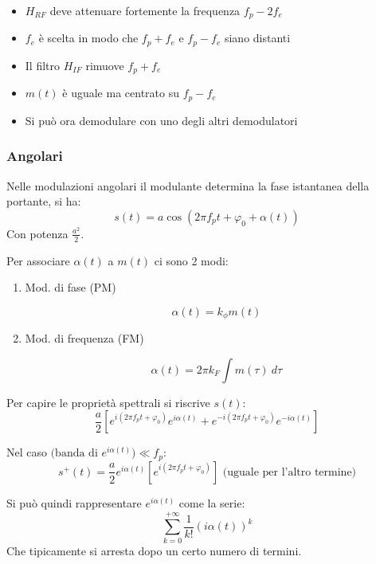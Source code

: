 \documentclass{article}
\begin{document}
\begin{itemize}
    \begin{itemize}
        \item $H_{RF}$ deve attenuare fortemente la frequenza $f_p-2f_e$
        \item $f_e$ è scelta in modo che $f_p+f_e$ e $f_p-f_e$ siano distanti
        \item Il filtro $H_{IF}$ rimuove $f_p+f_e$
        \item $m(t)$ è uguale ma centrato su $f_p- f_e$
        \item Si può ora demodulare con uno degli altri demodulatori
    \end{itemize}
    
\end{itemize}

\newpage

\subsubsection{Angolari}

Nelle modulazioni angolari il modulante determina la fase istantanea della portante, si ha:
$$s(t)=a\cos(2\pi f_pt+\varphi_0+\alpha(t))$$
\noindent Con potenza $\frac{a^2}{2}$.\newline

\noindent Per associare $\alpha(t)$ a $m(t)$ ci sono 2 modi:
\begin{enumerate}
    \item Mod. di fase (PM)

        $$\alpha(t)=k_\phi m(t)$$
    
    \item Mod. di frequenza (FM)

        $$\alpha(t)=2\pi k_F\int m(\tau)\ d\tau$$\newline
    
\end{enumerate}

\noindent Per capire le proprietà spettrali si riscrive $s(t)$:
$$\frac{a}{2}\left[e^{i(2\pi f_pt+\varphi_0)}e^{i\alpha(t)}+e^{-i(2\pi f_pt+\varphi_0)}e^{-i\alpha(t)}\right]$$

\noindent Nel caso $\text{(banda di }e^{i\alpha(t)})\ll f_p$:
$$s^+(t)=\frac{a}{2}e^{i\alpha(t)}[e^{i(2\pi f_pt+\varphi_0)}]\text{ (uguale per l'altro termine)}$$\newline

\noindent Si può quindi rappresentare $e^{i\alpha(t)}$ come la serie:
$$\sum_{k=0}^{+\infty}\frac{1}{k!}(i\alpha(t))^k$$
\noindent Che tipicamente si arresta dopo un certo numero di termini.\newline
\end{document}
